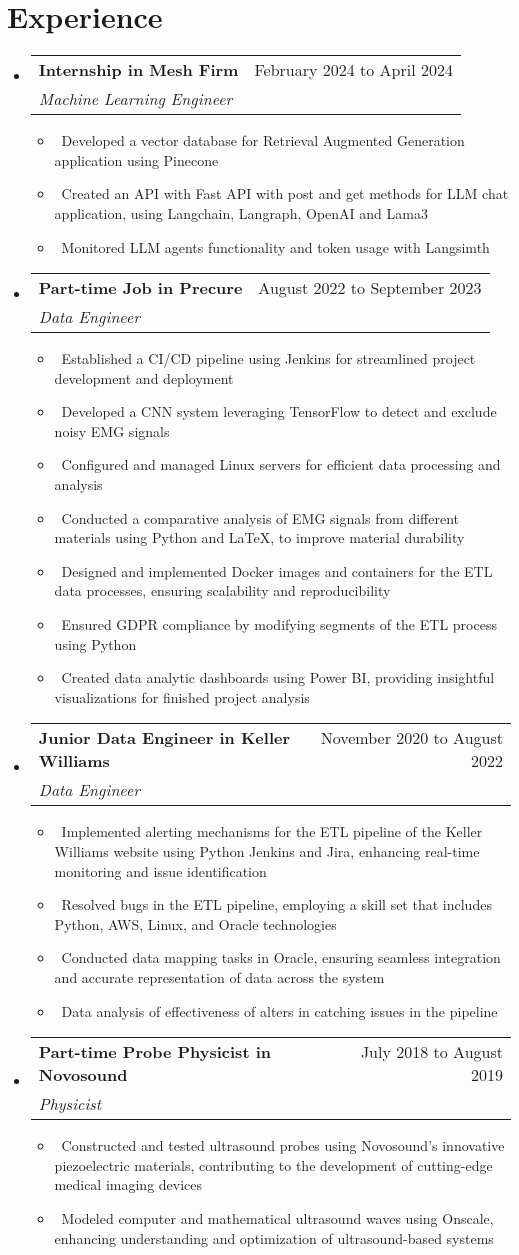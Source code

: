 \documentclass[letterpaper,10pt]{article}
\makeatletter
\newcommand{\resumeItem}[1]{\item\small{#1}}
\newcommand{\resumeSubheading}[4]{
\vspace{-1pt}\item
  \begin{tabular*}{0.97\textwidth}[t]{l@{\extracolsep{\fill}}r}
    \textbf{#1} & #2 \\
    \textit{#3} & \textit{#4} \\
  \end{tabular*}\vspace{-7pt}
}
\newcommand{\resumeSubHeadingList}{\begin{itemize}[leftmargin=0.15in, label={}]}
\newcommand{\resumeSubHeadingListEnd}{\end{itemize}}
\makeatother
\begin{document}
\section{Experience}
\resumeSubHeadingList
  \resumeSubheading
      {Internship in Mesh Firm}{February 2024 to April 2024}
      {Machine Learning Engineer}{}
      \resumeSubHeadingList
          \resumeItem{\textbullet\ Developed a vector database for Retrieval Augmented Generation application using Pinecone}
          \resumeItem{\textbullet\ Created an API with Fast API with post and get methods for LLM chat application, using Langchain, Langraph, OpenAI and Lama3}
          \resumeItem{\textbullet\ Monitored LLM agents functionality and token usage with Langsimth}
      \resumeSubHeadingListEnd
  \resumeSubheading
      {Part-time Job in Precure}{August 2022 to September 2023}
      {Data Engineer}{}
      \resumeSubHeadingList
          \resumeItem{\textbullet\ Established a CI/CD pipeline using Jenkins for streamlined project development and deployment}
          \resumeItem{\textbullet\ Developed a CNN system leveraging TensorFlow to detect and exclude noisy EMG signals}
          \resumeItem{\textbullet\ Configured and managed Linux servers for efficient data processing and analysis}
          \resumeItem{\textbullet\ Conducted a comparative analysis of EMG signals from different materials using Python and LaTeX, to improve material durability}
          \resumeItem{\textbullet\ Designed and implemented Docker images and containers for the ETL data processes, ensuring scalability and reproducibility}
          \resumeItem{\textbullet\ Ensured GDPR compliance by modifying segments of the ETL process using Python}
          \resumeItem{\textbullet\ Created data analytic dashboards using Power BI, providing insightful visualizations for finished project analysis}
      \resumeSubHeadingListEnd
  \resumeSubheading
      {Junior Data Engineer in Keller Williams}{November 2020 to August 2022}
      {Data Engineer}{}
      \resumeSubHeadingList
          \resumeItem{\textbullet\ Implemented alerting mechanisms for the ETL pipeline of the Keller Williams website using Python Jenkins and Jira, enhancing real-time monitoring and issue identification}
          \resumeItem{\textbullet\ Resolved bugs in the ETL pipeline, employing a skill set that includes Python, AWS, Linux, and Oracle technologies}
          \resumeItem{\textbullet\ Conducted data mapping tasks in Oracle, ensuring seamless integration and accurate representation of data across the system}
          \resumeItem{\textbullet\ Data analysis of effectiveness of alters in catching issues in the pipeline}
      \resumeSubHeadingListEnd
  \resumeSubheading
      {Part-time Probe Physicist in Novosound}{July 2018 to August 2019}
      {Physicist}{}
      \resumeSubHeadingList
          \resumeItem{\textbullet\ Constructed and tested ultrasound probes using Novosound's innovative piezoelectric materials, contributing to the development of cutting-edge medical imaging devices}
          \resumeItem{\textbullet\ Modeled computer and mathematical ultrasound waves using Onscale, enhancing understanding and optimization of ultrasound-based systems}
      \resumeSubHeadingListEnd
\resumeSubHeadingListEnd
\end{document}
